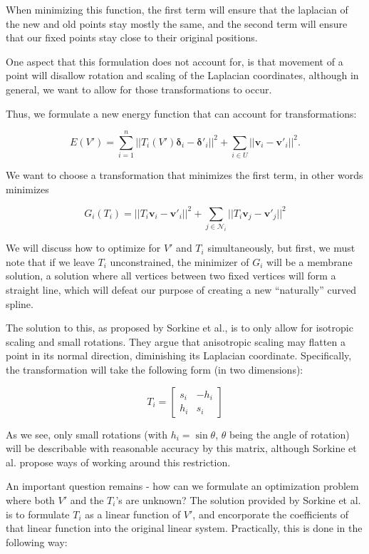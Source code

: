 \documentclass[english]{article}
\begin{document}
When minimizing this function, the first term will ensure that the laplacian of the new and old points stay mostly the same, and the second term will ensure that our fixed points stay close to their original positions.

One aspect that this formulation does not account for, is that movement of a point will disallow rotation and scaling of the Laplacian coordinates, although in general, we want to allow for those transformations to occur. 

Thus, we formulate a new energy function that can account for transformations:

\begin{equation}
  E(V') = \sum_{i = 1}^n || T_i(V') \mathbf{\delta}_i - \mathbf{\delta'}_i||^2 + \sum_{i \in U} || \mathbf{v}_i - \mathbf{v'}_i||^2.
  \label{eq1}
\end{equation}

We want to choose a transformation that minimizes the first term, in other words minimizes

\[
G_i(T_i) = || T_i\mathbf{v}_i - \mathbf{v'}_i ||^2 + \sum_{j \in \mathcal{N}_i}||T_i \mathbf{v}_j - \mathbf{v'}_j||^2
\]

We will discuss how to optimize for $V'$ and $T_i$ simultaneously, but first, we must note that if we leave $T_i$ unconstrained, the minimizer of $G_i$ will be a membrane solution, a solution where all vertices between two fixed vertices will form a straight line, which will defeat our purpose of creating a new ``naturally'' curved spline.

The solution to this, as proposed by Sorkine et al., is to only allow for isotropic scaling and small rotations. They argue that anisotropic scaling may flatten a point in its normal direction, diminishing its Laplacian coordinate. Specifically, the transformation will take the following form (in two dimensions):

\[
T_i = \left[
  \begin{matrix}
    s_i & -h_i \\
    h_i & s_i
  \end{matrix}
  \right]
\]

As we see, only small rotations (with $h_i = \sin \theta$, $\theta$ being the angle of rotation) will be describable with reasonable accuracy by this matrix, although Sorkine et al. propose ways of working around this restriction.

An important question remains - how can we formulate an optimization problem where both $V'$ and the $T_i$'s are unknown? The solution provided by Sorkine et al. is to formulate $T_i$ as a linear function of $V'$, and encorporate the coefficients of that linear function into the original linear system. Practically, this is done in the following way:
\end{document}
